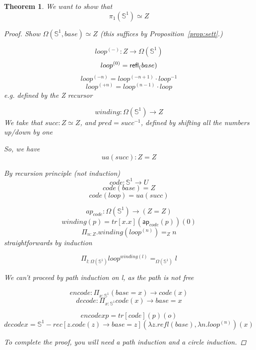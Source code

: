 \documentclass[11pt]{article}
\renewcommand{\SS}{\mathbb{S}}
\newcommand*{\ap}{\mathsf{ap}}
\newtheorem{thm}{Theorem}
\begin{document}
\begin{thm}
We want to show that
$$\pi_1(\SS^1) \simeq Z$$
\begin{proof}
Show $\Omega(\SS^1, base) \simeq Z$ (this suffices by Proposition~\ref{prop:sett}.)

$$loop^{(-)} : Z \rightarrow \Omega(\SS^1)$$
$$loop^{(0)} = \mathsf{refl}_{(} base)$$
$$loop^{(-n)} = loop^{(-n + 1)} \cdot loop^{-1}$$
$$loop^{(+n)} = loop^{(n - 1)} \cdot loop$$
e.g. defined by the Z recursor

$$winding : \Omega(\SS^{1}) \rightarrow Z$$
We take that $succ : Z \simeq Z$, and $pred = succ^{-1}$, defined by shifting all the numbers up/down by one

So, we have
$$ua(succ) : Z = Z$$

By recursion principle (not induction)
$$code : \SS^1 \rightarrow U$$
$$code(base) = Z$$
$$code(loop) = ua(succ)$$

$$ap_{code} : \Omega(\SS^1) \rightarrow (Z = Z)$$
$$winding(p) = tr[x.x](\ap_{code}(p))(0)$$
$$\Pi_{n : Z} . winding(loop^{(n)}) =_Z n$$
straightforwards by induction

$$\Pi_{l : \Omega(\SS^1)} loop^{winding(l)} =_{\Omega(\SS^1)} l$$

We can't proceed by path induction on l, as the path is not free

$$encode : \Pi_{x : \SS^1} (base = x) \rightarrow code(x)$$
$$decode : \Pi_{x : \SS^1} code(x) \rightarrow base = x$$

$$encode x p = tr[code](p)(o)$$
$$decode x = \SS^1-rec[z.code(z) \rightarrow base = z](\lambda z . refl(base), \lambda n . loop^{(n)})(x)$$

To complete the proof, you will need a path induction and a circle induction.
\end{proof}
\end{thm}
\end{document}
